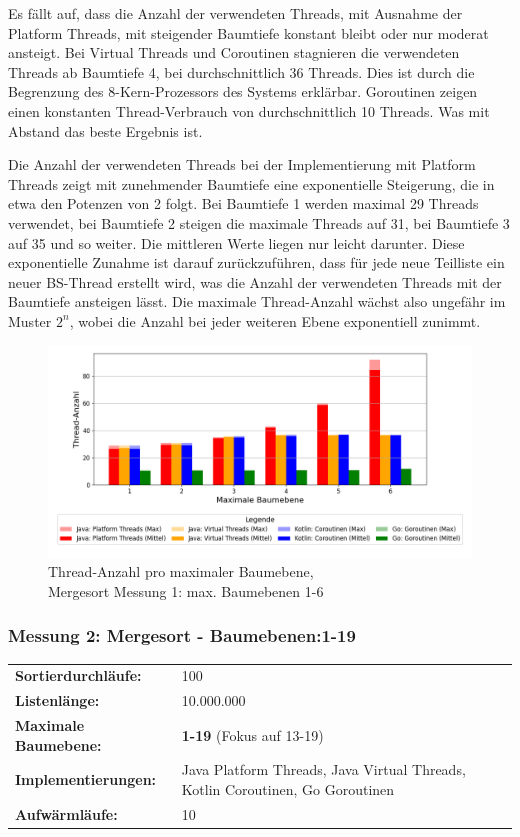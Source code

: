 \documentclass[fontsize=12pt,paper=a4,twoside=semi,parskip=half-,headsepline,headinclude]{scrreprt}
\begin{document}
Es fällt auf, dass die Anzahl der verwendeten Threads, mit Ausnahme der Platform Threads, mit steigender Baumtiefe konstant bleibt oder nur moderat ansteigt. Bei Virtual Threads und Coroutinen stagnieren die verwendeten Threads ab Baumtiefe 4, bei durchschnittlich 36 Threads. Dies ist durch die Begrenzung des 8-Kern-Prozessors des Systems erklärbar. Goroutinen zeigen einen konstanten Thread-Verbrauch von durchschnittlich 10 Threads. Was mit Abstand das beste Ergebnis ist. 

Die Anzahl der verwendeten Threads bei der Implementierung mit Platform Threads zeigt mit zunehmender Baumtiefe eine exponentielle Steigerung, die in etwa den Potenzen von 2 folgt. Bei Baumtiefe 1 werden maximal 29 Threads verwendet, bei Baumtiefe 2 steigen die maximale Threads auf 31, bei Baumtiefe 3 auf 35 und so weiter. Die mittleren Werte liegen nur leicht darunter. Diese exponentielle Zunahme ist darauf zurückzuführen, dass für jede neue Teilliste ein neuer BS-Thread erstellt wird, was die Anzahl der verwendeten Threads mit der Baumtiefe ansteigen lässt. Die maximale Thread-Anzahl wächst also ungefähr im Muster $2^n$, wobei die Anzahl bei jeder weiteren Ebene exponentiell zunimmt.

\begin{figure}[H]
	\centering
	\includegraphics[scale=0.5]{figures/mergesort/Maximalebauebenen1-6/num_threads_bar_plot.png}
	\caption{Thread-Anzahl pro maximaler Baumebene,\\ Mergesort Messung 1: max. Baumebenen 1-6}
	\label{fig:ms1-6Threads}
\end{figure}

\subsubsection{Messung 2: Mergesort - Baumebenen:1-19}

\begin{tabularx}{\textwidth}{@{}lX@{}}
	\textbf{Sortierdurchläufe:} & 100 \\
	\textbf{Listenlänge:} & 10.000.000 \\
	\textbf{Maximale Baumebene:} & \textbf{1-19} (Fokus auf 13-19) \\
	\textbf{Implementierungen:} & Java Platform Threads, Java Virtual Threads, Kotlin Coroutinen, Go Goroutinen \\
	\textbf{Aufwärmläufe:} & 10
\end{tabularx}
\end{document}
